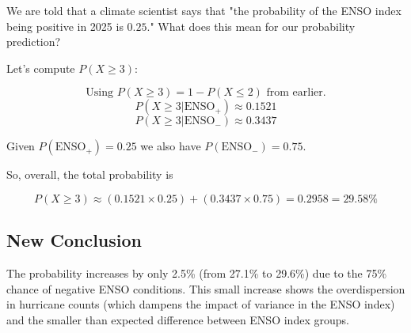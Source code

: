\documentclass[11pt,spanish]{report}
\begin{document}
    We are told that a climate scientist says that "the probability of the ENSO index being positive in 2025 is $0.25$." What does this mean for our probability prediction?

    Let's compute $P(X\geq3)$:

    \[\text{Using }P(X\geq3)=1-P(X\leq2)\text{ from earlier.}\]
    \[P(X\geq3|\text{ENSO}_{+})\approx0.1521\]
    \[P(X\geq3|\text{ENSO}_{-})\approx0.3437\]

    Given $P(\text{ENSO}_{+})=0.25$ we also have $P(\text{ENSO}_{-})=0.75$.

    So, overall, the total probability is

    \[P(X\geq3)\approx(0.1521\times0.25)+(0.3437\times0.75)=0.2958=29.58\%\]

    \subsection{New Conclusion}

    The probability increases by only 2.5\% (from 27.1\% to 29.6\%) due to the 75\% chance of negative ENSO conditions. This small increase shows the overdispersion in hurricane counts (which dampens the impact of variance in the ENSO index) and the smaller than expected difference between ENSO index groups.
 

    
\end{document}
